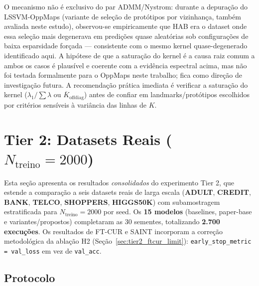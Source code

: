 \documentclass[12pt,a4paper]{article}
\begin{document}
\begin{tcolorbox}[colback=warnbg, colframe=warnborder, fonttitle=\bfseries,
  title=\textbf{Achado --- HAB: o kernel saturado degenera a seleção
  \emph{colnorm} e o Nyström piora o ADMM}]
O mecanismo não é exclusivo do par ADMM/Nystrom: durante a depuração do
LSSVM-OppMaps (variante de seleção de protótipos por vizinhança, também
avaliada neste estudo), observou-se empiricamente que HAB era o dataset
onde essa seleção mais degenerava em
predições quase aleatórias sob configurações de baixa esparsidade forçada ---
consistente com o mesmo kernel quase-degenerado identificado aqui. A hipótese
de que a saturação do kernel é a causa raiz comum a ambos os casos é plausível
e coerente com a evidência espectral acima, mas não foi testada formalmente
para o OppMaps neste trabalho; fica como direção de investigação futura.
A recomendação prática imediata é verificar a saturação do kernel
($\lambda_1/\sum\lambda$ ou $\overline{K}_{\text{offdiag}}$) antes de confiar
em landmarks/protótipos escolhidos por critérios sensíveis à variância das
linhas de $K$.
\end{tcolorbox}

\section{Tier 2: Datasets Reais ($N_{\text{treino}}=2000$)}
\label{sec:tier2}

Esta seção apresenta os resultados \emph{consolidados} do experimento Tier 2,
que estende a comparação a seis datasets reais de larga escala
(\textbf{ADULT}, \textbf{CREDIT}, \textbf{BANK}, \textbf{TELCO},
\textbf{SHOPPERS}, \textbf{HIGGS50K}) com subamostragem estratificada para
$N_{\text{treino}}=2000$ por seed. Os \textbf{15 modelos} (baselines, paper-base
e variantes/propostos) completaram as 30 sementes, totalizando
\textbf{2.700 execuções}. Os resultados de FT-CUR e SAINT incorporam a correção
metodológica da ablação H2 (Seção~\ref{sec:tier2_ftcur_limit}):
\texttt{early\_stop\_metric = val\_loss} em vez de \texttt{val\_acc}.

\subsection{Protocolo}
\end{document}
